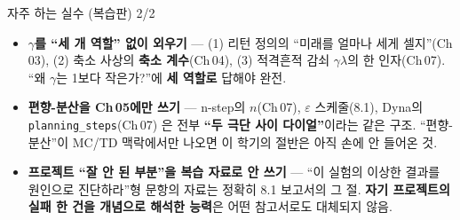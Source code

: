 \documentclass[aspectratio=169,11pt]{beamer}
\begin{document}
\begin{frame}{자주 하는 실수 (복습판) 2/2}
  \begin{itemize}
    \item \textbf{$\gamma$를 ``세 개 역할'' 없이 외우기} ---
      (1) 리턴 정의의 ``미래를 얼마나 세게 셀지''(Ch\,03),
      (2) 축소 사상의 \textbf{축소 계수}(Ch\,04), (3) 적격흔적 감쇠
      $\gamma\lambda$의 한 인자(Ch\,07). ``왜 $\gamma$는 1보다
      작은가?''에 \textbf{세 역할로} 답해야 완전.
    \item \textbf{편향-분산을 Ch\,05에만 쓰기} --- n-step의 $n$(Ch\,07),
      $\varepsilon$ 스케줄(8.1), Dyna의 \texttt{planning\_steps}(Ch\,07)
      은 전부 \textbf{``두 극단 사이 다이얼''}이라는 같은 구조.
      ``편향-분산''이 MC/TD 맥락에서만 나오면 이 학기의 절반은 아직
      손에 안 들어온 것.
    \item \textbf{프로젝트 ``잘 안 된 부분''을 복습 자료로 안 쓰기} ---
      ``이 실험의 이상한 결과를 원인으로 진단하라''형 문항의 자료는
      정확히 8.1 보고서의 그 절. \textbf{자기 프로젝트의 실패 한 건을
      개념으로 해석한 능력}은 어떤 참고서로도 대체되지 않음.
  \end{itemize}
\end{frame}

\end{document}
